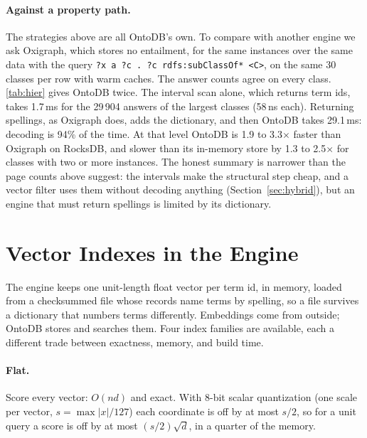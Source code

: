 \documentclass[sigconf, nonacm]{acmart}
\newcommand{\sys}{OntoDB}
\begin{document}
\paragraph{Against a property path.} The strategies above are all \sys's own. To compare with another engine we ask Oxigraph, which stores no entailment, for the same instances over the same data with the query \texttt{?x a ?c . ?c rdfs:subClassOf* <C>}, on the same 30 classes per row with warm caches. The answer counts agree on every class. \autoref{tab:hier} gives \sys{} twice. The interval scan alone, which returns term ids, takes 1.7\,ms for the 29\,904 answers of the largest classes (58\,ns each). Returning spellings, as Oxigraph does, adds the dictionary, and then \sys{} takes 29.1\,ms: decoding is 94\% of the time. At that level \sys{} is 1.9 to 3.3$\times$ faster than Oxigraph on RocksDB, and slower than its in-memory store by 1.3 to 2.5$\times$ for classes with two or more instances. The honest summary is narrower than the page counts above suggest: the intervals make the structural step cheap, and a vector filter uses them without decoding anything (Section~\ref{sec:hybrid}), but an engine that must return spellings is limited by its dictionary.



\section{Vector Indexes in the Engine}
\label{sec:vectors}

The engine keeps one unit-length float vector per term id, in memory, loaded from a checksummed file whose records name terms by spelling, so a file survives a dictionary that numbers terms differently. Embeddings come from outside; \sys{} stores and searches them. Four index families are available, each a different trade between exactness, memory, and build time.

\paragraph{Flat.} Score every vector: $O(nd)$ and exact. With 8-bit scalar quantization (one scale per vector, $s=\max|x|/127$) each coordinate is off by at most $s/2$, so for a unit query a score is off by at most $(s/2)\sqrt d$, in a quarter of the memory.
\end{document}
